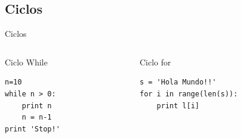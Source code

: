 \documentclass[11pt]{beamer}
\begin{document}
\subsection{Ciclos}
\begin{frame}[fragile]{Ciclos}
\begin{columns}
\begin{column}{0.5\linewidth}
\begin{exampleblock}{Ciclo While}
\begin{verbatim}
n=10
while n > 0:
    print n
    n = n-1
print 'Stop!'
\end{verbatim}
\end{exampleblock}
\end{column}
\pause
\begin{column}{0.5\linewidth}
\begin{exampleblock}{Ciclo for}
\begin{verbatim}
s = 'Hola Mundo!!'
for i in range(len(s)):
    print l[i]
\end{verbatim}
\end{exampleblock}
\end{column}
\end{columns}
\end{frame}
\end{document}
